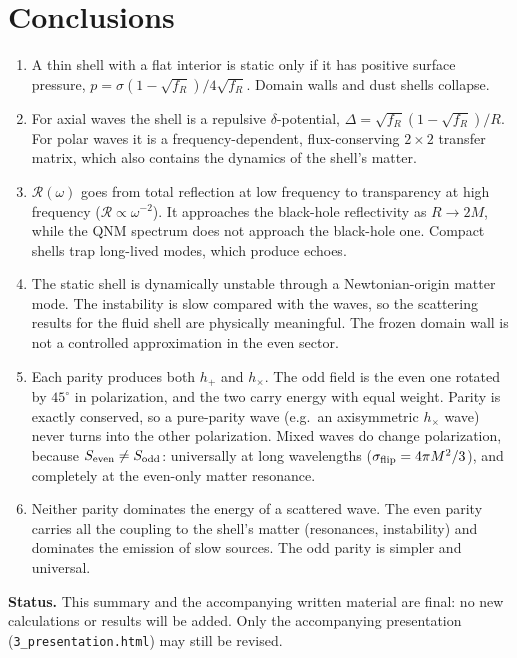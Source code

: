 \documentclass[10pt,a4paper]{article}
\newcommand{\sq}{\sqrt{f_R}}
\newcommand{\RR}{\mathcal R}
\begin{document}
\section{Conclusions}
\begin{enumerate}
\item A thin shell with a flat interior is static only if it has positive surface pressure,
$p=\sigma(1-\sq)/4\sq$. Domain walls and dust shells collapse.
\item For axial waves the shell is a repulsive $\delta$-potential, $\Delta=\sq(1-\sq)/R$. For polar waves it is a
frequency-dependent, flux-conserving $2\times2$ transfer matrix, which also contains the dynamics of the shell's matter.
\item $\RR(\omega)$ goes from total reflection at low frequency to transparency at high frequency ($\RR\propto\omega^{-2}$).
It approaches the black-hole reflectivity as $R\to2M$, while the QNM spectrum does not approach the black-hole one.
Compact shells trap long-lived modes, which produce echoes.
\item The static shell is dynamically unstable through a Newtonian-origin matter mode. The instability is slow compared
with the waves, so the scattering results for the fluid shell are physically meaningful. The frozen domain wall is not
a controlled approximation in the even sector.
\item Each parity produces both $h_+$ and $h_\times$. The odd field is the even one rotated by $45^\circ$ in polarization, and the
two carry energy with equal weight. Parity is exactly conserved, so a pure-parity wave (e.g.\ an axisymmetric $h_\times$ wave)
never turns into the other polarization. Mixed waves do change polarization, because $S_{\rm even}\ne S_{\rm odd}$: universally at
long wavelengths ($\sigma_{\rm flip}=4\pi M^2/3$), and completely at the even-only matter resonance.
\item Neither parity dominates the energy of a scattered wave. The even parity carries all the coupling to the shell's
matter (resonances, instability) and dominates the emission of slow sources. The odd parity is simpler and universal.
\end{enumerate}

\noindent\colorbox{idea!8}{\parbox{\dimexpr\linewidth-2\fboxsep}{\small\textbf{\color{idea}Status.} This summary and the
accompanying written material are final: no new calculations or results will be added. Only the accompanying presentation
(\texttt{3\_presentation.html}) may still be revised.}}
\end{document}
